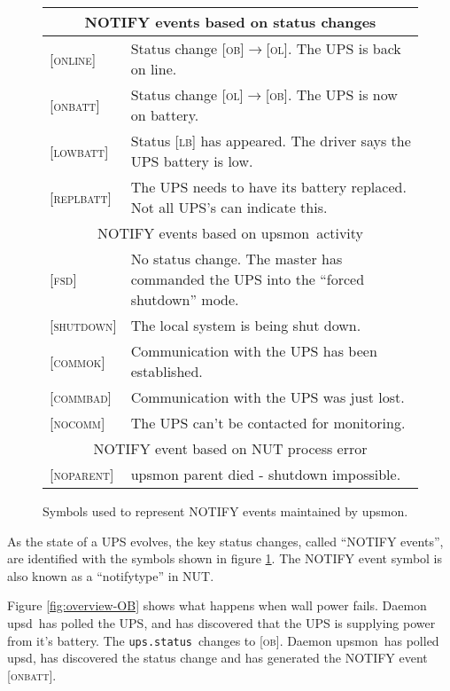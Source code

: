 \documentclass[12pt]{article}
\newcommand{\upsd}{\mbox{\textcolor{UPSDCOLOUR}{upsd}}}
\newcommand{\upsmon}{\mbox{\textcolor{MONCOLOUR}{upsmon}}}
\newcommand{\FSDev}{\textcolor{MONCOLOUR}{\textsc{fsd}}}
\newcommand{\LB}{\textcolor{UPSDCOLOUR}{\textsc{lb}}}
\newcommand{\OB}{\textcolor{UPSDCOLOUR}{\textsc{ob}}}
\newcommand{\OL}{\textcolor{UPSDCOLOUR}{\textsc{ol}}}
\newcommand{\ONLINE}{\textcolor{MONCOLOUR}{\textsc{online}}}
\newcommand{\ONBATT}{\textcolor{MONCOLOUR}{\textsc{onbatt}}}
\newcommand{\LOWBATT}{\textcolor{MONCOLOUR}{\textsc{lowbatt}}}
\newcommand{\COMMOK}{\textcolor{MONCOLOUR}{\textsc{commok}}}
\newcommand{\COMMBAD}{\textcolor{MONCOLOUR}{\textsc{commbad}}}
\newcommand{\SHUTDOWN}{\textcolor{MONCOLOUR}{\textsc{shutdown}}}
\newcommand{\REPLBATT}{\textcolor{MONCOLOUR}{\textsc{replbatt}}}
\newcommand{\NOCOMM}{\textcolor{MONCOLOUR}{\textsc{nocomm}}}
\newcommand{\NOPARENT}{\textcolor{NUTCOLOUR}{\textsc{noparent}}}
\newcommand{\status}[1]{\textcolor{UPSDCOLOUR}{[{#1}]}}
\newcommand{\statuschange}[2]{\status{#1}{\allowbreak}\textcolor{UPSDCOLOUR}{$\rightarrow$}{\allowbreak}\status{#2}}
\newcommand{\NOTev}[1]{\textcolor{MONCOLOUR}{[{#1}]}}
\newcommand{\upsstatus}{\textcolor{UPSDCOLOUR}{\texttt{ups{\allowbreak}.status}}}
\begin{document}
\begin{figure}[ht]
\begin{center}
\begin{tabular}{|l|p{0.75\LinePrinterwidth}|}
\hline
\multicolumn{2}{|c|}{NOTIFY events based on status changes} \\ \hline
\NOTev{\ONLINE}   & Status change \statuschange{\OB}{\OL}.  The UPS is back on line. \\ \hline
\NOTev{\ONBATT}   & Status change \statuschange{\OL}{\OB}.  The UPS is now on battery. \\ \hline
\NOTev{\LOWBATT}  & Status \status{\LB} has appeared. The driver says the UPS battery is low. \\ \hline
\NOTev{\REPLBATT} & The UPS needs to have its battery replaced.  Not all UPS's can indicate this. \\ \hline\hline
\multicolumn{2}{|c|}{NOTIFY events based on \upsmon\ activity} \\ \hline
\NOTev{\FSDev}    & No status change.  The master has commanded the UPS into the ``forced shutdown'' mode. \\ \hline
\NOTev{\SHUTDOWN} & The local system is being shut down. \\ \hline
\NOTev{\COMMOK}   & Communication with the UPS has been established. \\ \hline
\NOTev{\COMMBAD}  & Communication with the UPS was just lost. \\ \hline
\NOTev{\NOCOMM}   & The UPS can't be contacted for monitoring. \\ \hline\hline
\multicolumn{2}{|c|}{NOTIFY event based on NUT process error} \\ \hline
\NOTev{\NOPARENT} & upsmon parent died - shutdown impossible. \\ \hline
\end{tabular}
\caption{Symbols used to represent NOTIFY events maintained by \upsmon.\label{fig:NOTIFYevents}}
\end{center}
\end{figure}

As the state of a UPS evolves, the key status changes, called ``NOTIFY
events'', are identified with the symbols shown in figure
\ref{fig:NOTIFYevents}.  The NOTIFY event symbol is also known as a
``notifytype'' in NUT.

Figure \ref{fig:overview-OB} shows what happens when wall power fails.  Daemon
\upsd\ has polled the UPS, and has discovered that the UPS is supplying power
from it's battery.  The \upsstatus\ changes to \status{\OB}.  Daemon
\upsmon\ has polled \upsd, has discovered the status change and has generated
the NOTIFY event \NOTev{\ONBATT}.
\end{document}
